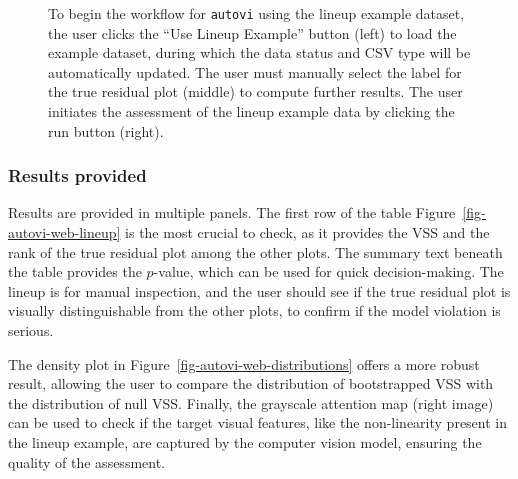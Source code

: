 \documentclass[
doublespace,
  times]{anzsauth}
\begin{document}
\begin{figure}


\caption{\label{fig-autovi-web-setup}To begin the workflow for
\texttt{autovi} using the lineup example dataset, the user clicks the
``Use Lineup Example'' button (left) to load the example dataset, during
which the data status and CSV type will be automatically updated. The
user must manually select the label for the true residual plot (middle)
to compute further results. The user initiates the assessment of the
lineup example data by clicking the run button (right).}

\end{figure}%

\subsubsection{Results provided}\label{results-provided}

Results are provided in multiple panels. The first row of the table
Figure~\ref{fig-autovi-web-lineup} is the most crucial to check, as it
provides the VSS and the rank of the true residual plot among the other
plots. The summary text beneath the table provides the \(p\)-value,
which can be used for quick decision-making. The lineup is for manual
inspection, and the user should see if the true residual plot is
visually distinguishable from the other plots, to confirm if the model
violation is serious.

The density plot in Figure~\ref{fig-autovi-web-distributions} offers a
more robust result, allowing the user to compare the distribution of
bootstrapped VSS with the distribution of null VSS. Finally, the
grayscale attention map (right image) can be used to check if the target
visual features, like the non-linearity present in the lineup example,
are captured by the computer vision model, ensuring the quality of the
assessment.
\end{document}
